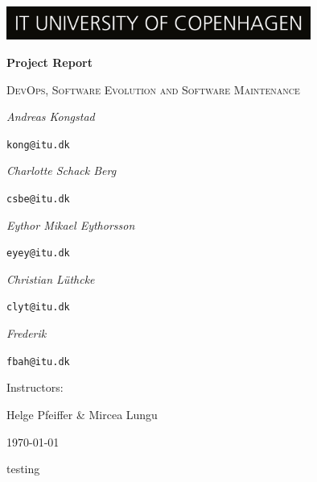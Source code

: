 \documentclass{scrartcl}
\begin{document}
\begin{titlepage}
    \centering
    \includegraphics[width=10cm]{images/ITU_logo_UK jpg.jpg}
    \vspace{1.5cm}
    
	{\huge\bfseries Project Report\par}
	\vspace{1cm}
    {\scshape\Large DevOps, Software Evolution and Software Maintenance \par}
	\vspace{2cm}
	{\Large\itshape Andreas Kongstad}\par
	\texttt{kong@itu.dk}\par
	\vspace{0.5cm}
	{\Large\itshape Charlotte Schack Berg}\par
	\texttt{csbe@itu.dk}\par
	\vspace{0.5cm}
	{\Large\itshape Eythor Mikael Eythorsson}\par
	\texttt{eyey@itu.dk}\par
	\vspace{0.5cm}
	{\Large\itshape Christian Lüthcke}\par
	\texttt{clyt@itu.dk}\par
	\vspace{0.5cm}
	{\Large\itshape Frederik}\par
	\texttt{fbah@itu.dk}\par
	\vfill
	Instructors:\par
    Helge Pfeiffer \& Mircea Lungu

	\vspace{1cm}

	{\large \today\par}
\end{titlepage}

\newpage
\tableofcontents

testing

\newpage



\end{document}
